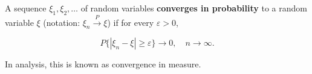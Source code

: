 A sequence $\xi_1, \xi_2, \ldots$ of random variables \textbf{converges in probability} to a random variable $\xi$ (notation: $\xi_n \xrightarrow{P} \xi$) if for every $\varepsilon > 0$,

$$P\{|\xi_n - \xi| \geq \varepsilon\} \to 0, \quad n \to \infty.$$

In analysis, this is known as convergence in measure.
